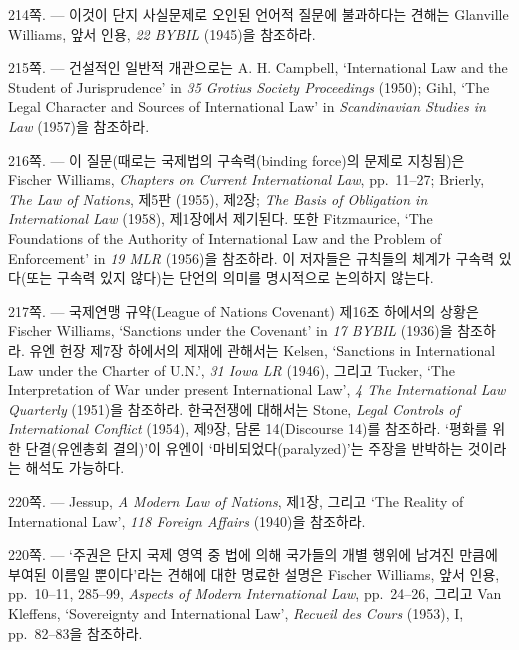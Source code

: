 {\footnotesize
\noteentry 214쪽.  --- 이것이 단지 사실문제로 오인된
언어적 질문에 불과하다는 견해는 Glanville Williams, 앞서 인용, \emph{22
BYBIL} (1945)을 참조하라.

\noteentry 215쪽.  --- 건설적인 일반적
개관으로는 A. H. Campbell, `International Law and the Student of
Jurisprudence' in \emph{35 Grotius Society Proceedings} (1950); Gihl,
`The Legal Character and Sources of International Law' in
\emph{Scandinavian Studies in Law} (1957)을 참조하라.

\noteentry 216쪽.  --- 이
질문(때로는 국제법의 구속력(binding force)의 문제로 지칭됨)은 Fischer
Williams, \emph{Chapters on Current International Law}, pp.~11--27;
Brierly, \emph{The Law of Nations}, 제5판 (1955), 제2장; \emph{The Basis
of Obligation in International Law} (1958), 제1장에서 제기된다. 또한
Fitzmaurice, `The Foundations of the Authority of International Law and
the Problem of Enforcement' in \emph{19 MLR} (1956)을 참조하라. 이
저자들은 규칙들의 체계가 구속력 있다(또는 구속력 있지 않다)는 단언의
의미를 명시적으로 논의하지 않는다.

\noteentry 217쪽.  --- 국제연맹 규약(League of
Nations Covenant) 제16조 하에서의 상황은 Fischer Williams, `Sanctions
under the Covenant' in \emph{17 BYBIL} (1936)을 참조하라. 유엔 헌장
제7장 하에서의 제재에 관해서는 Kelsen, `Sanctions in International Law
under the Charter of U.N.', \emph{31 Iowa LR} (1946), 그리고 Tucker,
`The Interpretation of War under present International Law', \emph{4 The
International Law Quarterly} (1951)을 참조하라. 한국전쟁에 대해서는
Stone, \emph{Legal Controls of International Conflict} (1954), 제9장,
담론 14(Discourse 14)를 참조하라. ‘평화를 위한 단결(유엔총회 결의)’이
유엔이 ‘마비되었다(paralyzed)’는 주장을 반박하는 것이라는 해석도
가능하다.

\noteentry 220쪽.  --- Jessup,
\emph{A Modern Law of Nations}, 제1장, 그리고 `The Reality of
International Law', \emph{118 Foreign Affairs} (1940)을 참조하라.

\noteentry 220쪽.  --- ‘주권은 단지
국제 영역 중 법에 의해 국가들의 개별 행위에 남겨진 만큼에 부여된 이름일
뿐이다’라는 견해에 대한 명료한 설명은 Fischer Williams, 앞서 인용,
pp.~10--11, 285--99, \emph{Aspects of Modern International Law},
pp.~24--26, 그리고 Van Kleffens, `Sovereignty and International Law',
\emph{Recueil des Cours} (1953), I, pp.~82--83을 참조하라.

}

